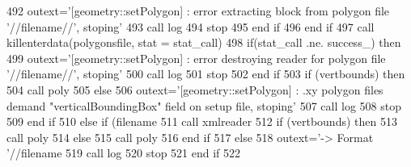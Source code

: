 \begin{DoxyCode}
492                 outext=\textcolor{stringliteral}{'[geometry::setPolygon] : error extracting block from polygon file '}//filename//\textcolor{stringliteral}{',
       stoping'}
493                 \textcolor{keyword}{call }log%
494                 stop
495 \textcolor{keywordflow}{            end if}
496 \textcolor{keywordflow}{        end if}
497         \textcolor{keyword}{call }killenterdata(polygonsfile, stat = stat\_call)
498         \textcolor{keywordflow}{if}(stat\_call .ne. success\_) \textcolor{keywordflow}{then}
499             outext=\textcolor{stringliteral}{'[geometry::setPolygon] : error destroying reader for polygon file '}//filename//\textcolor{stringliteral}{',
       stoping'}
500             \textcolor{keyword}{call }log%
501             stop
502 \textcolor{keywordflow}{        end if}
503         \textcolor{keywordflow}{if} (vertbounds) \textcolor{keywordflow}{then}
504             \textcolor{keyword}{call }poly%
505         \textcolor{keywordflow}{else}
506             outext=\textcolor{stringliteral}{'[geometry::setPolygon] : .xy polygon files demand "verticalBoundingBox" field on setup
       file, stoping'}
507             \textcolor{keyword}{call }log%
508             stop
509 \textcolor{keywordflow}{        end if}
510      \textcolor{keywordflow}{else} \textcolor{keywordflow}{if} (filename%
511          \textcolor{keyword}{call }xmlreader%
512          \textcolor{keywordflow}{if} (vertbounds) \textcolor{keywordflow}{then}
513             \textcolor{keyword}{call }poly%
514         \textcolor{keywordflow}{else}
515             \textcolor{keyword}{call }poly%
516 \textcolor{keywordflow}{        end if}
517     \textcolor{keywordflow}{else}
518         outext=\textcolor{stringliteral}{'-> Format '}//filename%
519         \textcolor{keyword}{call }log%
520         stop
521 \textcolor{keywordflow}{    end if}
522 
\end{DoxyCode}
\mbox{\label{namespacegeometry__mod_a9b4ea4b26bc4f50dbfa3ba8b1d3fb2f2}} 
